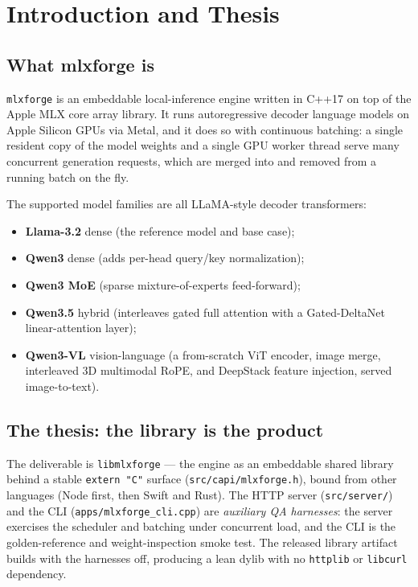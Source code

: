 \documentclass[11pt,a4paper]{report}
\newcommand{\code}[1]{\texttt{#1}}
\begin{document}
\tableofcontents

\chapter{Introduction and Thesis}
\label{ch:intro}

\section{What mlxforge is}
\code{mlxforge} is an embeddable local-inference engine written in C++17 on top of
the Apple MLX core array library. It runs autoregressive decoder language models
on Apple Silicon GPUs via Metal, and it does so with continuous batching: a single
resident copy of the model weights and a single GPU worker thread serve many
concurrent generation requests, which are merged into and removed from a running
batch on the fly.

The supported model families are all LLaMA-style decoder transformers:
\begin{itemize}[nosep]
  \item \textbf{Llama-3.2} dense (the reference model and base case);
  \item \textbf{Qwen3} dense (adds per-head query/key normalization);
  \item \textbf{Qwen3 MoE} (sparse mixture-of-experts feed-forward);
  \item \textbf{Qwen3.5} hybrid (interleaves gated full attention with a
        Gated-DeltaNet linear-attention layer);
  \item \textbf{Qwen3-VL} vision-language (a from-scratch ViT encoder, image
        merge, interleaved 3D multimodal RoPE, and DeepStack feature injection,
        served image-to-text).
\end{itemize}

\section{The thesis: the library is the product}
The deliverable is \code{libmlxforge} --- the engine as an embeddable shared
library behind a stable \code{extern "C"} surface (\code{src/capi/mlxforge.h}),
bound from other languages (Node first, then Swift and Rust). The HTTP server
(\code{src/server/}) and the CLI (\code{apps/mlxforge\_cli.cpp}) are
\emph{auxiliary QA harnesses}: the server exercises the scheduler and
batching under concurrent load, and the CLI is the golden-reference and
weight-inspection smoke test. The released library artifact builds with the
harnesses off, producing a lean dylib with no \code{httplib} or \code{libcurl}
dependency.
\end{document}
